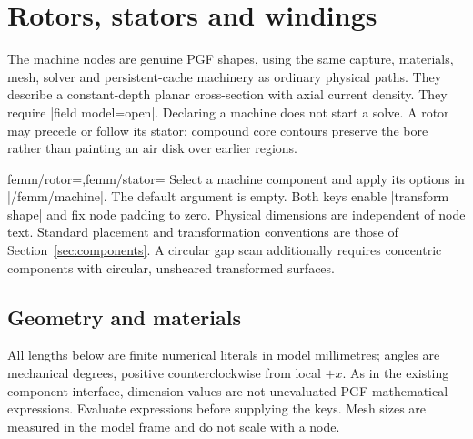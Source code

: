 \section{Rotors, stators and windings}
\label{sec:machines}

The machine nodes are genuine PGF shapes, using the same capture, materials,
mesh, solver and persistent-cache machinery as ordinary physical paths.
They describe a constant-depth planar cross-section with axial current density.
They require |field model=open|. Declaring a machine does not start a solve.
A rotor may precede or follow its stator: compound core contours preserve the
bore rather than painting an air disk over earlier regions.

\begin{keylist}[/tikz]{femm/rotor=,femm/stator=}
Select a machine component and apply its options in |/femm/machine|.
The default argument is empty. Both keys enable |transform shape| and fix
node padding to zero. Physical dimensions are independent of node text.
Standard placement and transformation conventions are those of
Section~\ref{sec:components}. A circular gap scan additionally requires
concentric components with circular, unsheared transformed surfaces.
\end{keylist}

\subsection{Geometry and materials}
All lengths below are finite numerical literals in model millimetres; angles
are mechanical degrees, positive counterclockwise from local $+x$.
As in the existing component interface, dimension values are not unevaluated
PGF mathematical expressions. Evaluate expressions before supplying the keys.
Mesh sizes are measured in the model frame and do not scale with a node.

